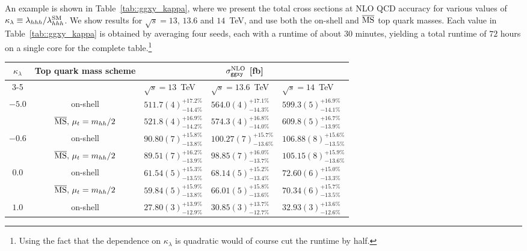 An example is shown in Table~\ref{tab::ggxy_kappa}, where we present the total cross sections at NLO QCD accuracy for various
values of $\kappa_\lambda \equiv \lambda_{hhh}/\lambda_{hhh}^{\rm SM}$. We show results for $\sqrt{s}=13$, $13.6$ and $14$~TeV,
and use both the on-shell and $\overline{\rm MS}$ top quark masses. Each value in Table~\ref{tab::ggxy_kappa} is obtained by averaging four seeds, each with a runtime of about $30$ minutes, yielding a total runtime of $72$ hours on a single core for the complete table.\footnote{Using the fact that the dependence on $\kappa_\lambda$ is quadratic would of course cut the runtime by half.}
\begin{table}[t!]
    \centering
    \renewcommand{\arraystretch}{1.2}
    \begin{tabular}{cc@{\hskip 7mm}lll}
        \toprule
         \multirow{2}{*}{$\kappa_\lambda$}&\multirow{2}{*}{Top quark mass scheme}
         & \multicolumn{3}{c}{$\sigma^{\rm NLO}_{\rm \tt ggxy}$ [fb]} \\
         \cmidrule(lr){3-5}
         & & $\sqrt{s}=13$~TeV & $\sqrt{s}=13.6$~TeV & $\sqrt{s}=14$~TeV\\
        \midrule
        \multirow{2}{*}{$-5.0$} & on-shell & $ 511.7(4)^{+17.2\%}_{-14.4\%} $ & $ 564.0(4)^{+17.1\%}_{-14.3\%} $ & $ 599.3(5)^{+16.9\%}_{-14.1\%} $ \\
               & $\overline{\rm MS},\,\mu_t=m_{hh}/2$ & $ 521.8(4)^{+16.9\%}_{-14.2\%} $ & $ 574.3(4)^{+16.8\%}_{-14.0\%} $ & $ 609.8(5)^{+16.7\%}_{-13.9\%} $   \\ %
        \midrule
        \multirow{2}{*}{$-0.6$} & on-shell & $ 90.80(7)^{+15.8\%}_{-13.8\%} $ & $ 100.27(7)^{+15.7\%}_{-13.6\%} $ & $ 106.88(8)^{+15.6\%}_{-13.5\%} $ \\
               & $\overline{\rm MS},\,\mu_t=m_{hh}/2$ & $ 89.51(7)^{+16.2\%}_{-13.9\%} $ & $ 98.85(7)^{+16.0\%}_{-13.7\%} $ & $ 105.15(8)^{+15.9\%}_{-13.6\%} $ \\ %
        \midrule
        \multirow{2}{*}{$0.0$} & on-shell & $ 61.54(5)^{+15.3\%}_{-13.5\%} $ & $ 68.14(5)^{+15.2\%}_{-13.4\%} $ & $ 72.60(6)^{+15.0\%}_{-13.3\%} $  \\
              & $\overline{\rm MS},\,\mu_t=m_{hh}/2$ & $ 59.84(5)^{+15.9\%}_{-13.8\%} $ & $ 66.01(5)^{+15.8\%}_{-13.6\%} $ & $ 70.34(6)^{+15.7\%}_{-13.5\%} $ \\ %
        \midrule
        \multirow{2}{*}{$1.0$} & on-shell & $ 27.80(3)^{+13.9\%}_{-12.9\%} $ & $ 30.85(3)^{+13.7\%}_{-12.7\%} $ & $ 32.93(3)^{+13.6\%}_{-12.6\%} $  \\

\end{tabular}
\end{table}

